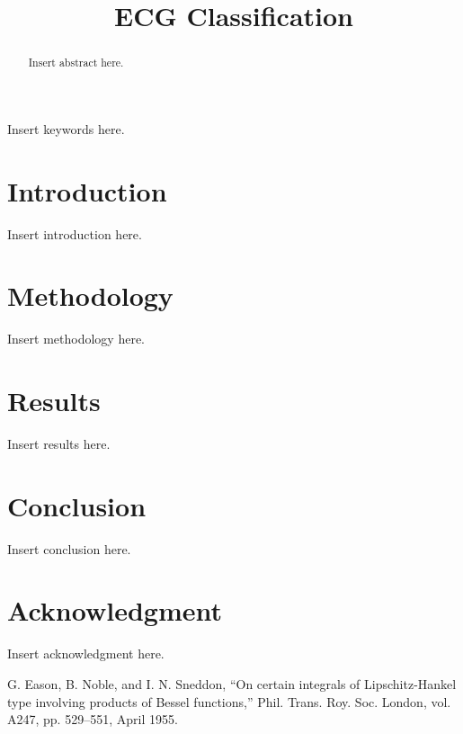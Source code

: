 \documentclass[conference]{IEEEtran}
\begin{document}
\title{ECG Classification}
\author{}

\maketitle

\begin{abstract}
Insert abstract here.
\end{abstract}

\begin{IEEEkeywords}
Insert keywords here.
\end{IEEEkeywords}

\section{Introduction}
Insert introduction here.

\section{Methodology}
Insert methodology here.

\section{Results}
Insert results here.

\section{Conclusion}
Insert conclusion here.

\section*{Acknowledgment}
Insert acknowledgment here.




\begin{thebibliography}{00}
     G. Eason, B. Noble, and I. N. Sneddon, ``On certain integrals of Lipschitz-Hankel type involving products of Bessel functions,'' Phil. Trans. Roy. Soc. London, vol. A247, pp. 529--551, April 1955.
\end{thebibliography}
\end{document}

